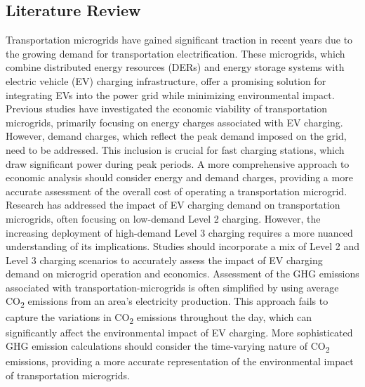 \documentclass[conference,  usletter]{IEEEtran}
\begin{document}
\subsection{Literature Review}
Transportation microgrids have gained significant traction in recent years due to the growing demand for transportation electrification. These microgrids, which combine distributed energy resources (DERs) and energy storage systems with electric vehicle (EV) charging infrastructure, offer a promising solution for integrating EVs into the power grid while minimizing environmental impact. Previous studies have investigated the economic viability of transportation microgrids, primarily focusing on energy charges associated with EV charging. However, demand charges, which reflect the peak demand imposed on the grid, need to be addressed. This inclusion is crucial for fast charging stations, which draw significant power during peak periods. A more comprehensive approach to economic analysis should consider energy and demand charges, providing a more accurate assessment of the overall cost of operating a transportation microgrid. Research has addressed the impact of EV charging demand on transportation microgrids, often focusing on low-demand Level 2 charging. However, the increasing deployment of high-demand Level 3 charging requires a more nuanced understanding of its implications. Studies should incorporate a mix of Level 2 and Level 3 charging scenarios to accurately assess the impact of EV charging demand on microgrid operation and economics. Assessment of the GHG emissions associated with transportation-microgrids is often simplified by using average CO\textsubscript{2} emissions from an area's electricity production. This approach fails to capture the variations in CO\textsubscript{2} emissions throughout the day, which can significantly affect the environmental impact of EV charging. More sophisticated GHG emission calculations should consider the time-varying nature of CO\textsubscript{2} emissions, providing a more accurate representation of the environmental impact of transportation microgrids. 
\end{document}
